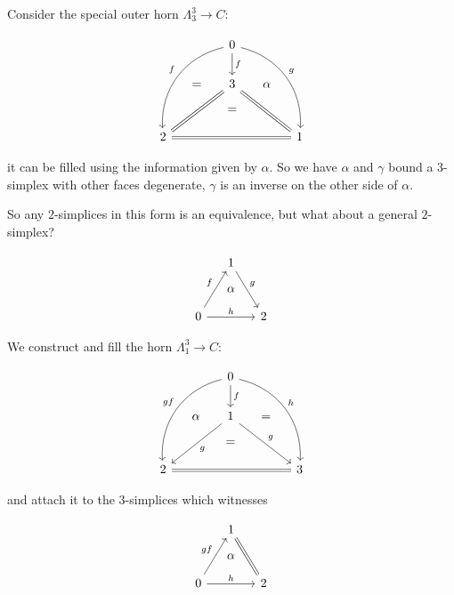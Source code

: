 \documentclass[11pt]{article}
\begin{document}
Consider the special outer horn $\Lambda^3_3\to C$:

\begin{equation*}
\begin{tikzcd}[column sep=small, row sep=small]
	& & 0 \arrow{dd}{f}\arrow[swap,bend right=40]{ddddll}{f} \arrow[bend left=40]{ddddrr}{g} \\
	\\
	& = & 3\arrow[equal]{ddll}{} \arrow[equal]{ddrr}{} & \alpha \\
	& & = \\
	2 \arrow[equal]{rrrr}{} & & & & 1
\end{tikzcd}
\end{equation*}

 it can be filled using the information given by $\alpha$. So we have $\alpha$ and $\gamma$ bound a $3$-simplex with other faces degenerate, $\gamma$ is an inverse on the other side of $\alpha$.

So any $2$-simplices in this form is an equivalence, but what about a general $2$-simplex? 


\begin{equation*}
\begin{tikzcd}[column sep=small, row sep=small]
& 1 \arrow{rdd}{g} \\
& \alpha \\
0 \arrow{uur}{f} \arrow{rr}{h} &  & 2
\end{tikzcd}
\end{equation*}

We construct and fill the horn $\Lambda^3_1\to C$:

\begin{equation*}
\begin{tikzcd}[column sep=small, row sep=small]
& & 0 \arrow{dd}{f}\arrow[swap,bend right=40]{ddddll}{gf} \arrow[bend left=40]{ddddrr}{h} \\
\\
& \alpha & 1\arrow{ddll}{g} \arrow{ddrr}{g} & = \\
& & = \\
2 \arrow[equal]{rrrr}{} & & & & 3
\end{tikzcd}
\end{equation*}



and attach it to the $3$-simplices which witnesses 


\begin{equation*}
\begin{tikzcd}[column sep=small, row sep=small]
& 1 \arrow[equal]{rdd}{} \\
& \alpha \\
0 \arrow{uur}{gf} \arrow{rr}{h} &  & 2
\end{tikzcd}
\end{equation*}
\end{document}
